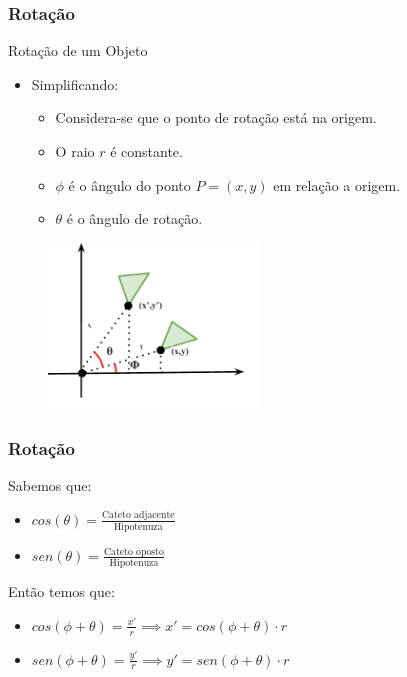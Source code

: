 \documentclass{beamer}
\begin{document}
\begin{frame}
\frametitle{Rotação}


	\begin{block}{Rotação de um Objeto}
		\begin{itemize}
			\item Simplificando:
			\begin{itemize}
				\item Considera-se que o ponto de rotação está na origem.
				\item O raio $r$ é constante.
				\item $\phi$ é o ângulo do ponto $P = (x,y)$ em relação a origem.
				\item $\theta$ é o ângulo de rotação.
			\end{itemize}
		\end{itemize}
	\end{block}
	
	\begin{figure}[!h]
			\begin{center}
			\includegraphics[width=0.5\textwidth]{Figures/ExemploRotacao2}
			\end{center}
	\end{figure}
	
\end{frame}


\begin{frame}
\frametitle{Rotação}

	\begin{block}{Sabemos que:}
		\begin{itemize}
			\item $cos(\theta) = \frac{\text{Cateto adjacente}}{\text{Hipotenuza}}$
			\item $sen(\theta) = \frac{\text{Cateto oposto}}{\text{Hipotenuza}}$
		\end{itemize}
	\end{block}

	\begin{block}{Então temos que:}
		\begin{itemize}
			\item $cos(\phi + \theta) = \frac{x'}{r} \implies x' = cos(\phi + \theta)\cdot r$
			\item $sen(\phi + \theta) = \frac{y'}{r} \implies y' = sen(\phi + \theta)\cdot r$
		\end{itemize}
	\end{block}
	
\end{frame}
\end{document}
